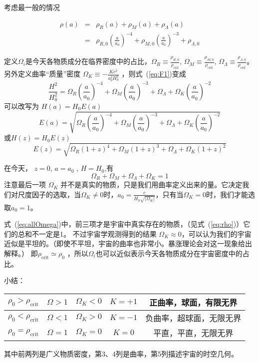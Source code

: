 \documentclass[12pt]{ctexart}
\newcommand{\refeq}[1]{式~(\ref{#1})}
\begin{document}
考虑最一般的情况

\begin{eqnarray}
    \rho(a) &=& \rho_R(a) + \rho_M(a) + \rho_\Lambda (a) \label{eq:rho}
    \\ &=& \rho_{R,0}\left(\frac{a}{a_0}\right)^{-4} + \rho_{M,0}\left(\frac{a}{a_0}\right)^{-3}  + \rho_{\Lambda,0}     
\end{eqnarray}

定义$\Omega_i$是今天各物质成分在临界密度中的占比，$\Omega_R\equiv\frac{\rho_{R,0}}{\rho_\text{crit}}$, $\Omega_M\equiv\frac{\rho_{M,0}}{\rho_\text{crit}}$, $\Omega_\Lambda\equiv\frac{\rho_{\Lambda,0}}{\rho_\text{crit}}$。
另外定义曲率“质量”密度 $\Omega_K \equiv -\frac{K c^2}{a_0^2 H_0^2}$ ，则\refeq{eq:F1}变成
\begin{equation}
    \frac{H^2}{H_0^2} = \Omega_R \left(\frac{a}{a_0}\right)^{-4} + \Omega_M \left(\frac{a}{a_0}\right)^{-3} + \Omega_\Lambda + \Omega_K \left(\frac{a}{a_0}\right)^{-2}
\end{equation}
可以改写为 $H(a)=H_0 E(a)$
\begin{equation}
    E(a) = \sqrt{ \Omega_R \left(\frac{a}{a_0}\right)^{-4} + \Omega_M \left(\frac{a}{a_0}\right)^{-3} + \Omega_\Lambda + \Omega_K \left(\frac{a}{a_0}\right)^{-2} }
\end{equation}
或$H(z)=H_0 E(z)$
\begin{equation}
    E(z) = \sqrt{ \Omega_R \left(1+z\right)^{4} + \Omega_M \left(1+z\right)^{3} + \Omega_\Lambda + \Omega_K \left(1+z\right)^{2} }
\end{equation}

在今天， $z=0$, $a=a_0$ , $H=H_0$,有
\begin{equation}
    \Omega_R + \Omega_M + \Omega_\Lambda + \Omega_K = 1 \label{eq:allOmega}
\end{equation}
注意最后一项 $\Omega_K$ 并不是真实的物质，只是我们用曲率定义出来的量。它决定我们对尺度因子的选取，当$\Omega_K\neq 0$时，$a_0=\frac{c}{H_0\sqrt{|\Omega_K|}}$，只有当$\Omega_K = 0$时，我们才能选取$a_0=1$。

\refeq{eq:allOmega}中，前三项才是宇宙中真实存在的物质，（见\refeq{eq:rho}）它们的总和不一定是1。
不过宇宙学观测得到的结果 $\Omega_K \approx 0$，可以认为我们的宇宙近似是平坦的。（即使不平坦，宇宙的曲率也非常小。暴涨理论会对这一现象给出解释。） 
即$\rho_\text{crit}\simeq\rho_0$ ，所以$\Omega_i$也可以近似表示今天各物质成分在宇宙密度中的占比。

小结：
\begin{table}[H]
    \centering
    \begin{tabular}{|c|c|c|c|c|}
    \hline
    $\rho_0>\rho_\text{crit}$  & $\Omega>1$ & $\Omega_K<0$ & $K=+1$ & 正曲率，球面，有限无界 \\ \hline
    $\rho_0<\rho_\text{crit}$  & $\Omega<1$ & $\Omega_K>0$ & $K=-1$ & 负曲率，超球面，无限无界  \\ \hline
    $\rho_0=\rho_\text{crit}$  & $\Omega=1$ & $\Omega_K=0$ & $K=0$ & 平直，平直，无限无界 \\ \hline
    \end{tabular}
\end{table}

其中前两列是广义物质密度，第3、4列是曲率，第5列描述宇宙的时空几何。
\end{document}

